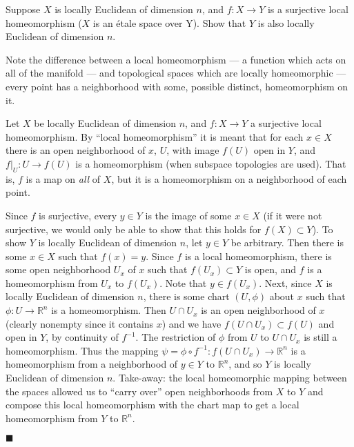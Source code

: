\documentclass[12pt]{article}
\renewcommand{\qed}{\hfill$\blacksquare$}
\renewenvironment{proof}{\begin{addmargin}[1em]{0em}\begin{newproof}}{\end{newproof}\end{addmargin}\qed}
\newenvironment{problem}[2][Problem]{\begin{trivlist}
\item[\hskip \labelsep {\bfseries #1}\hskip \labelsep {\bfseries #2.}]}{\end{trivlist}}
\begin{document}
\begin{problem}{2-24}
Suppose $X$ is locally Euclidean of dimension $n$, and $f:X\rightarrow Y$ is a surjective local homeomorphism {\color{red} ($X$ is an \'etale space over Y)}. Show that $Y$ is also locally Euclidean of dimension $n$.
\end{problem}
{\color{red} Note the difference between a local homeomorphism --- a function which acts on all of the manifold --- and topological spaces which are locally homeomorphic --- every point has a neighborhood with some, possible distinct, homeomorphism on it.}
\begin{proof}
Let $X$ be locally Euclidean of dimension $n$, and $f:X\rightarrow Y$ a surjective local homeomorphism. By ``local homeomorphism'' it is meant that for each $x\in X$ there is an open neighborhood of $x$, $U$, with image $f\left(U\right)$ open in $Y$, and $f|_{U}:U\rightarrow f\left(U\right)$ is a homeomorphism (when subspace topologies are used). That is, $f$ is a map on \textit{all} of $X$, but it is a homeomorphism on a neighborhood of each point.

Since $f$ is surjective, every $y\in Y$ is the image of some $x \in X$ {\color{red} (if it were not surjective, we would only be able to show that this holds for $f\left(X\right)\subset Y$)}. To show $Y$ is locally Euclidean of dimension $n$, let $y\in Y$ be arbitrary. Then there is some $x\in X$ such that $f\left(x\right)=y$. Since $f$ is a local homeomorphism, there is some open neighborhood $U_x$ of $x$ such that $f\left(U_x\right)\subset Y$ is open, and $f$ is a homeomorphism from $U_x$ to $f\left(U_x\right)$. Note that $y \in f\left(U_x\right)$. Next, since $X$ is locally Euclidean of dimension $n$, there is some chart $\left(U,\phi\right)$ about $x$ such that $\phi:U\rightarrow \mathbb{R}^n$ is a homeomorphism. Then $U \cap U_x $ is an open neighborhood of $x$ (clearly nonempty since it contains $x$) and we have $f\left(U\cap U_x\right) \subset f\left(U\right)$ and open in $Y$, by continuity of $f^{-1}$. The restriction of $\phi$ from $U$ to $U \cap U_x$ is still a homeomorphism. Thus the mapping $\psi = \phi \circ f^{-1}: f\left(U\cap U_x\right) \rightarrow \mathbb{R}^n$ is a homeomorphism from a neighborhood of $y \in Y$ to $\mathbb{R}^n$, and so $Y$ is locally Euclidean of dimension $n$. {\color{red} Take-away: the local homeomorphic mapping between the spaces allowed us to ``carry over'' open neighborhoods from $X$ to $Y$ and compose this local homeomorphism with the chart map to get a local homeomorphism from $Y$ to $\mathbb{R}^n$.}
\end{proof}
\end{document}
